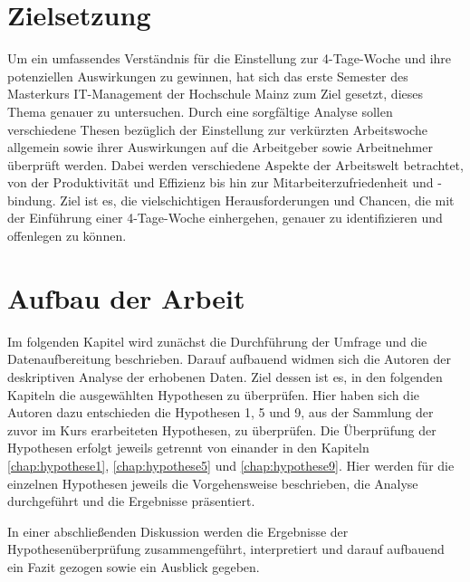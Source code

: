 \section{Zielsetzung}

Um ein umfassendes Verständnis für die Einstellung zur 4-Tage-Woche und ihre potenziellen Auswirkungen zu gewinnen, 
hat sich das erste Semester des Masterkurs IT-Management der Hochschule Mainz zum Ziel gesetzt, dieses Thema genauer zu untersuchen. 
Durch eine sorgfältige Analyse sollen verschiedene Thesen bezüglich der Einstellung zur verkürzten Arbeitswoche allgemein sowie 
ihrer Auswirkungen auf die Arbeitgeber sowie Arbeitnehmer überprüft werden. Dabei werden verschiedene Aspekte der Arbeitswelt 
betrachtet, von der Produktivität und Effizienz bis hin zur Mitarbeiterzufriedenheit und -bindung. Ziel ist es, die 
vielschichtigen Herausforderungen und Chancen, die mit der Einführung einer 4-Tage-Woche einhergehen, genauer zu identifizieren 
und offenlegen zu können.

\section{Aufbau der Arbeit}

Im folgenden Kapitel wird zunächst die Durchführung der Umfrage und die Datenaufbereitung beschrieben. Darauf aufbauend widmen sich die Autoren der deskriptiven Analyse der erhobenen Daten.
Ziel dessen ist es, in den folgenden Kapiteln die ausgewählten Hypothesen zu überprüfen. Hier haben sich die Autoren dazu entschieden die Hypothesen 1, 5 und 9, aus der Sammlung der zuvor
im Kurs erarbeiteten Hypothesen, zu überprüfen.
Die Überprüfung der Hypothesen erfolgt jeweils getrennt von einander in den Kapiteln \ref{chap:hypothese1}, \ref{chap:hypothese5} und \ref{chap:hypothese9}. Hier werden für die einzelnen Hypothesen
jeweils die Vorgehensweise beschrieben, die Analyse durchgeführt und die Ergebnisse präsentiert.


In einer abschließenden Diskussion werden die Ergebnisse der Hypothesenüberprüfung zusammengeführt, interpretiert und darauf aufbauend ein Fazit gezogen sowie ein Ausblick gegeben.